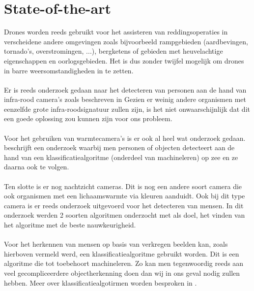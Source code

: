 \section{State-of-the-art}
\label{sec:state-of-the-art}

Drones worden reeds gebruikt voor het assisteren van reddingsoperaties in verscheidene andere omgevingen zoals bijvoorbeeld rampgebieden (aardbevingen, tornado's, overstromingen, ...)\autocite{DronesAndDisaster}, bergketens of gebieden met heuvelachtige eigenschappen \autocite{Mountains} en oorlogsgebieden. Het is dus zonder twijfel mogelijk om drones in barre weersomstandigheden in te zetten.\\\\
Er is reeds onderzoek gedaan naar het detecteren van personen aan de hand van infra-rood camera's zoals beschreven in \autocite{IR} Gezien er weinig andere organismen met eenzelfde grote infra-roodsignatuur zullen zijn, is het niet onwaarschijnlijk dat dit een goede oplossing zou kunnen zijn voor ons probleem.\\\\
Voor het gebruiken van warmtecamera's is er ook al heel wat onderzoek gedaan. \autocite{Heat} beschrijft een onderzoek waarbij men personen of objecten detecteert aan de hand van een klassificatiealgoritme (onderdeel van machineleren) op zee en ze daarna ook te volgen.\\\\ Ten slotte is er nog nachtzicht cameras. Dit is nog een andere soort camera die ook organismen met een lichaamswarmte via kleuren aanduidt. Ook bij dit type camera is er reeds onderzoek uitgevoerd voor het detecteren van mensen. In dit onderzoek werden 2 soorten algoritmen onderzocht met als doel, het vinden van het algoritme met de beste nauwkeurigheid. \autocite{Night}\\\\
Voor het herkennen van mensen op basis van verkregen beelden kan, zoals hierboven vermeld werd, een klassificatiealgoritme gebruikt worden. Dit is een algoritme die tot toebehoort machineleren. Zo kan men tegenwoordig reeds aan veel gecompliceerdere objectherkenning doen dan wij in ons geval nodig zullen hebben. Meer over klassificatiealgotirmen worden besproken in \autocite{Classification}.




